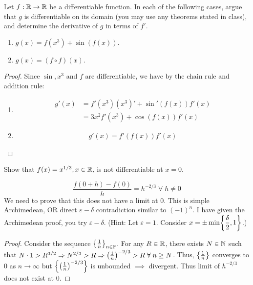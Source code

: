 \documentclass[12pt]{article}
\begin{document}
\begin{problem}
    Let $f : \mathbb{R} \to \mathbb{R}$ be a differentiable function.
    In each of the following cases, argue that $g$ is differentiable on its domain (you may use any theorems stated in class),
    and determine the derivative of $g$ in terms of $f'$.
    \begin{enumerate}[label=(\alph*)]
        \item $g(x) = f(x^{3}) + \sin(f(x))$.
        \item $g(x) = (f \circ f)(x)$.
    \end{enumerate}
\end{problem}
\begin{proof}
    Since $\sin, x^{3}$ and $f$ are differentiable, we have by the chain rule and addition rule:
    \begin{enumerate}[label=(\alph*)]
        \item 
        \begin{align*}
            g'(x) &= f'(x^{3}) (x^{3})' + \sin'(f(x)) f'(x) \\
            &= 3x^{2} f'(x^{3}) + \cos(f(x)) f'(x)
        \end{align*}
    
        \item 
        \begin{align*}
            g'(x) = f'(f(x)) f'(x)
        \end{align*}
    \end{enumerate}
\end{proof}

\begin{problem}
    Show that $f(x) = x^{1/3}, x \in \mathbb{R}$, is not differentiable at $x = 0$.
\end{problem}
\[
    \frac{f(0 + h) - f(0)}{h} = h^{-2/3} \;\forall\; h \neq 0
\]
We need to prove that this does not have a limit at 0.
This is simple Archimedean, OR direct $\varepsilon-\delta$ contradiction similar to $(-1)^{n}$.
I have given the Archimedean proof, you try $\varepsilon-\delta$.
(Hint: Let $\varepsilon = 1$.
Consider $x = \pm\min \set{\dfrac{\delta}{2}, 1}$.)

\begin{proof}
    Consider the sequence $\set{\frac{1}{n}}_{n \in \P}$.
    For any $R \in \mathbb{R}$, there exists $N \in \mathbb{N}$ such that $N \cdot 1 > R^{3/2} \implies N^{2/3} > R \implies \paren{\frac{1}{n}}^{-2/3} > R \;\forall\; n \geq N$.
    Thus, $\set{\frac{1}{n}}$ converges to 0 as $n \to \infty$ but $\set{\paren{\frac{1}{n}}^{-2/3}}$ is unbounded $\implies$ divergent.
    Thus limit of $h^{-2/3}$ does not exist at 0.
\end{proof}
\end{document}
